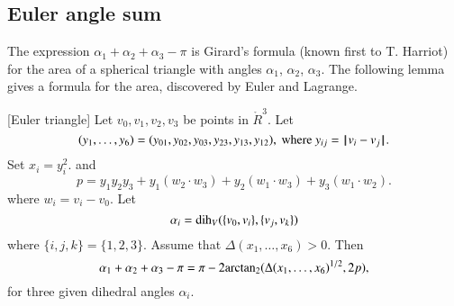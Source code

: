 \subsection{Euler angle sum}

The expression $\alpha_1+\alpha_2+\alpha_3-\pi$ is Girard's
formula (known first to T. Harriot) 
for the area of a spherical triangle with angles
$\alpha_1$, $\alpha_2$, $\alpha_3$.  The following lemma
gives a formula for the area, discovered by
Euler and Lagrange.

\begin{lemma}[Euler triangle]\label{lemma:euler}
Let $v_0,v_1,v_2,v_3$ be points in $\ring{R}^3$. 
Let 
  $$(y_1,\ldots,y_6) =(y_{01},y_{02},y_{03},y_{23},y_{13},y_{12}),
   \text{ where } y_{ij}={\hskip0.1em|\hskip-0.15em|\hskip0.1em}v_i - v_j{\hskip0.1em|\hskip-0.15em|\hskip0.1em}.$$
Set
$x_i = y_i^2$.   
and
    $$
    p = y_1 y_2 y_3 + y_1 (w_2\cdot w_3) + y_2 (w_1\cdot w_3) + y_3
    (w_1\cdot w_2).
    $$
where $w_i = v_i- v_0$.
Let $$\alpha_i =\operatorname{dih}_V(\{v_0,v_i\},\{v_j,v_k\})$$
where $\{i,j,k\}=\{1,2,3\}$.
Assume that $\Delta(x_1,\ldots,x_6)>0$. 
Then
    $$
    \alpha_1+\alpha_2+\alpha_3 - \pi
     = {\pi} - 2{\operatorname{arctan_2}}({\Delta(x_1,\ldots,x_6)^{1/2}},{2 p}),
    $$
for three given dihedral angles $\alpha_i$.
\end{lemma}

